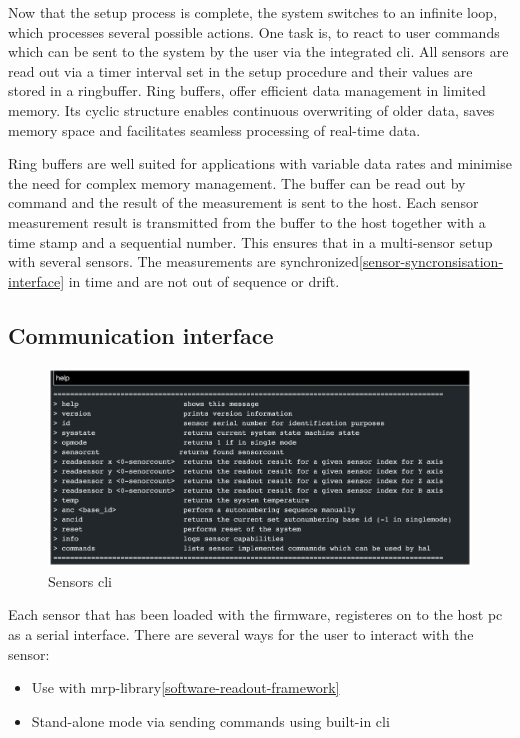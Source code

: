 Now that the setup process is complete, the system switches to an
infinite loop, which processes several possible actions. One task is, to
react to user commands which can be sent to the system by the user via
the integrated \gls{cli}. All sensors are read out via a timer interval
set in the setup procedure and their values are stored in a ringbuffer.
Ring buffers, offer efficient data management in limited memory. Its
cyclic structure enables continuous overwriting of older data, saves
memory space and facilitates seamless processing of real-time data.

Ring buffers are well suited for applications with variable data rates
and minimise the need for complex memory management. The buffer can be
read out by command and the result of the measurement is sent to the
host. Each sensor measurement result is transmitted from the buffer to
the host together with a time stamp and a sequential number. This
ensures that in a multi-sensor setup with several sensors. The
measurements are synchronized\ref{sensor-syncronsisation-interface} in
time and are not out of sequence or drift.

\hypertarget{communication-interface}{%
\subsection{Communication interface}\label{communication-interface}}

\begin{figure}
\centering
\includegraphics{./generated_images/border_Sensors_(+cli).png}
\caption{Sensors \gls{cli} \label{Sensors_(+cli).png}}
\end{figure}

Each sensor that has been loaded with the firmware, registeres on to the
host \gls{pc} as a serial interface. There are several ways for the user
to interact with the sensor:

\begin{itemize}
\tightlist
\item
  Use with \gls{mrp}-library\ref{software-readout-framework}
\item
  Stand-alone mode via sending commands using built-in \gls{cli}
\end{itemize}

